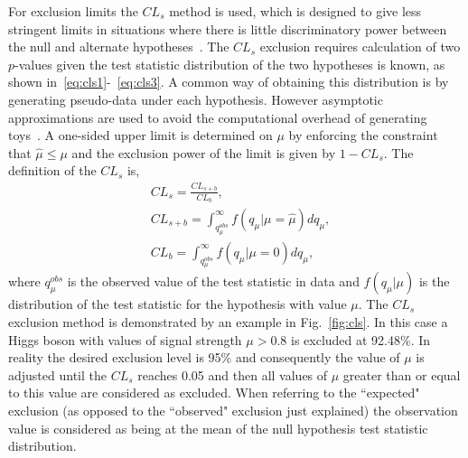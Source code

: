 For exclusion limits the $CL_{s}$ method is used, which is designed to give less stringent limits in situations where there is little discriminatory power between the null and alternate hypotheses~\cite{cls}. The $CL_{s}$ exclusion requires calculation of two $p$-values given the test statistic distribution of the two hypotheses is known, as shown in~\ref{eq:cls1}-~\ref{eq:cls3}. A common way of obtaining this distribution is by generating pseudo-data under each hypothesis. However asymptotic approximations are used to avoid the computational overhead of generating toys~\cite{asymptotic_form}. A one-sided upper limit is determined on $\mu$ by enforcing the constraint that $\hat{\mu}\leq\mu$ and the exclusion power of the limit is given by $1-CL_{s}$. The definition of the $CL_{s}$ is, 
\begin{align}
  & CL_{s} = \frac{CL_{s+b}}{CL_{b}} \label{eq:cls1}, \\
  & CL_{s+b} = \int_{q_{\mu}^{obs}}^{\infty}f(q_{\mu}|\mu=\hat{\mu})dq_{\mu} \label{eq:cls2}, \\
  & CL_{b} = \int_{q_{\mu}^{obs}}^{\infty}f(q_{\mu}|\mu=0)dq_{\mu} \label{eq:cls3}, 
\end{align}
where $q_{\mu}^{obs}$ is the observed value of the test statistic in data and $f(q_{\mu}|\mu)$ is the distribution of the test statistic for the hypothesis with value $\mu$. The $CL_{s}$ exclusion method is demonstrated by an example in Fig.~\ref{fig:cls}. In this case a \SM Higgs boson with values of signal strength $\mu>0.8$ is excluded at 92.48\%. In reality the desired exclusion level is 95\% and consequently the value of $\mu$ is adjusted until the $CL_{s}$ reaches 0.05 and then all values of $\mu$ greater than or equal to this value are considered as excluded. When referring to the ``expected" exclusion (as opposed to the ``observed" exclusion just explained) the observation value is considered as being at the mean of the null hypothesis test statistic distribution.

